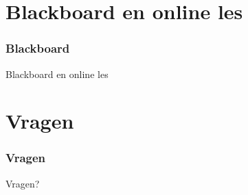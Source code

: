 
\section{Blackboard en online les}
\begin{frame}
	\frametitle{Blackboard}
	\begin{center}
	\begin{huge}
		Blackboard en online les
	\end{huge}
	\end{center}
\end{frame}


\section{Vragen}
\begin{frame}
	\frametitle{Vragen}
	\begin{center}
	\begin{huge}
		Vragen?
	\end{huge}
	\end{center}
\end{frame}
